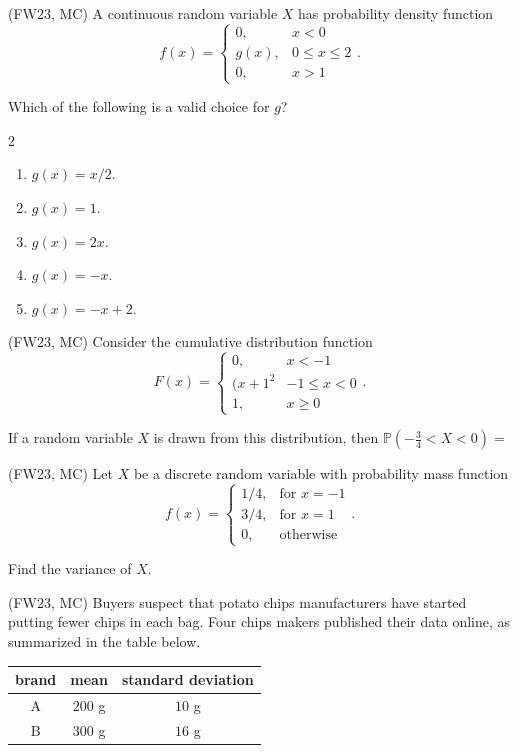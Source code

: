 \documentclass[aspectratio=169, t, 14pt]{beamer}
\begin{document}
\begin{frame}
  (FW23, MC) A continuous random variable \(X\) has probability density function 
  \[
    f(x) = \begin{cases} 0, & x < 0 \\ g(x), & 0 \le x \le 2 \\ 0, &x > 1 \end{cases}.
  \]

  Which of the following is a valid choice for \(g\)?

  \begin{multicols}{2}
  \begin{enumerate}
    \item \(g(x) = x/2\).
    \item \(g(x) = 1\).
    \item \(g(x) = 2x\).
    \item \(g(x) = -x\).
    \item \(g(x) = -x + 2\).
  \end{enumerate}
  \end{multicols}
\end{frame}

\begin{frame}
  (FW23, MC) Consider the cumulative distribution function 
  \[
    F(x) = 
    \begin{cases}
      0, & x < -1 \\
      (x+1^{2} & -1 \le x < 0 \\
      1, & x \ge 0
    \end{cases}.
  \]

  If a random variable \(X\) is drawn from this distribution, then \(\mathbb{P}\left(-\tfrac{3}{4} < X < 0\right) = \) 
\end{frame}

\begin{frame}
  (FW23, MC) Let \(X\) be a discrete random variable with probability mass function 
  \[
    f(x) = 
    \begin{cases}
      1/4, &\text{for } x = -1 \\
      3/4, &\text{for } x = 1 \\
      0,   &\text{otherwise}
    \end{cases}.
  \]

  Find the variance of \(X\).
\end{frame}

\begin{frame}
  (FW23, MC) Buyers suspect that potato chips manufacturers have started putting fewer chips in each bag. Four chips makers published their data online, as summarized in the table below.
  \begin{tabular}{ccc}
    \textbf{brand} & \textbf{mean} & \textbf{standard deviation} \\ \midrule
    A & \(200\) g & \(10\) g \\
    B & \(300\) g & \(16\) g
  \end{tabular}
\end{frame}
\end{document}
